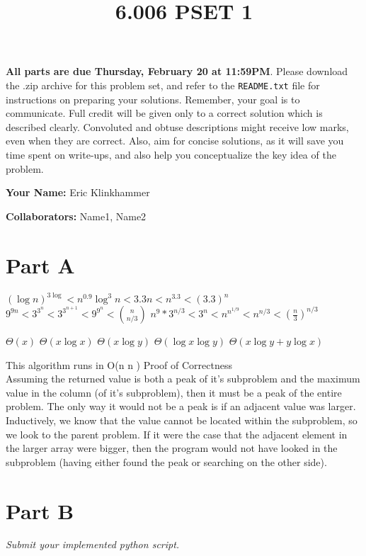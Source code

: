 \documentclass[12pt,twoside]{article}
\title{6.006 PSET 1}
\newcommand{\theproblemsetnum}{1}
\newcommand{\partaduedate}{Thursday, February 20}
\begin{document}
\handout{Problem Set \theproblemsetnum}{February 6, 2014}

\textbf{All parts are due {\bf \partaduedate} at {\bf 11:59PM}}.
%
Please download the .zip archive for this problem set, and refer to the
\texttt{README.txt} file for instructions on preparing your solutions.
%
Remember, your goal is to communicate. Full credit will be given only
to a correct solution which is described clearly. Convoluted and
obtuse descriptions might receive low marks, even when they are
correct. Also, aim for concise solutions, as it will save you time
spent on write-ups, and also help you conceptualize the key idea of
the problem.

\setlength{\parindent}{0pt}

\medskip

\hrulefill

\medskip

{\bf Your Name:} Eric Klinkhammer

\medskip

{\bf Collaborators:} Name1, Name2 

\medskip

\hrulefill

\begin{problems}
\section*{Part A}
\problem
\begin{problemparts}
\problempart $(\log n)^{3 \log } <  n^{0.9}\log^3n < 3.3n < n^{3.3}  < (3.3)^n$
\problempart $9^{9n} < 3^{3^n} < 3^{3^{n+1}}< 9^{9^n} < \binom{n}{n/3}$
\problempart $n^9*3^{n/3} < 3^n < n^{n^{1/9}} < n^{n/3} < \left(\frac{n}{3}\right)^{n/3}$
\end{problemparts}
\problem
\begin{problemparts}
\problempart $\Theta(x)$
\problempart $\Theta(x \log x)$
\problempart $\Theta(x \log y)$
\problempart $\Theta( \log x \log y )$
\problempart $\Theta(x\log y + y \log x)$
\end{problemparts}
\problem
\begin{problemparts}
\problempart This algorithm runs in O(n \log n )
\problempart Proof of Correctness\\
Assuming the returned value is both a peak of it's subproblem and the maximum value in the column (of it's subproblem), then it must be a peak 
of the entire problem.  The only way it would not be a peak is if an adjacent value was larger.  Inductively, we know that the value cannot be
located within the subproblem, so we look to the parent problem.  If it were the case that the adjacent element in the larger array were bigger,
then the program would not have looked in the subproblem (having either found the peak or searching on the other side).
\end{problemparts}
\problem
\problem
\problem

\section*{Part B}

\emph{Submit your implemented python script.}

\end{problems}
\end{document}

